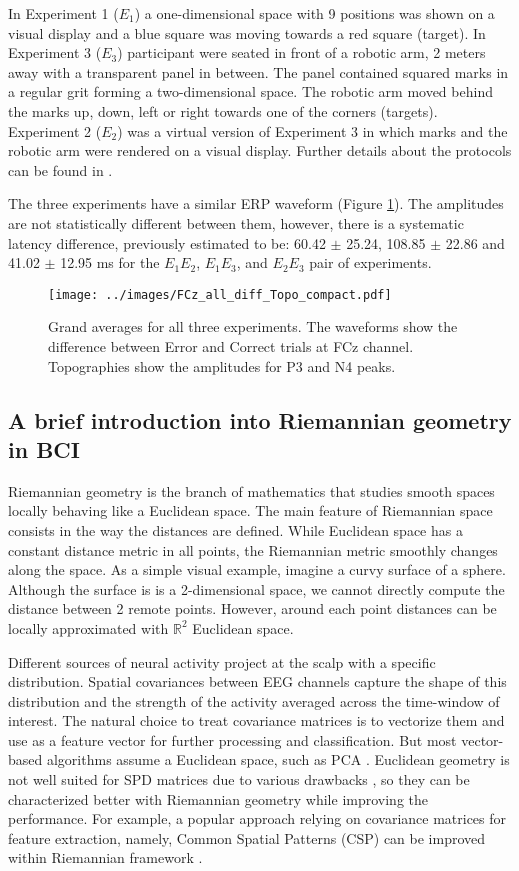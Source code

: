 \documentclass[12pt]{iopart}
\begin{document}
In Experiment 1 ($E_1$) a one-dimensional space with 9 positions was shown on a visual display and
a blue square was moving towards a red square (target). In Experiment 3 ($E_3$) participant were seated
in front of a robotic arm, 2 meters away with a transparent panel in between.
The panel contained squared marks in a regular grit forming a two-dimensional space.
The robotic arm moved behind the marks up, down, left or right 
towards one of the corners (targets).
Experiment 2 ($E_2$) was a virtual version of Experiment 3 in which marks and the robotic arm
were rendered on a visual display. Further details about the protocols can be found in \cite{iturrate_latency_2014-1}.

The three experiments have a similar ERP waveform (Figure \ref{fig:FCz}). The amplitudes are not statistically
different between them, however, there is a systematic latency
difference, previously estimated to be:
60.42 $\pm$ 25.24, 108.85 $\pm$ 22.86 and 41.02 $\pm$ 12.95 ms
for the $E_1 E_2$, $E_1 E_3$, and $E_2 E_3$ pair of experiments.

\begin{figure}[!t]
    \texttt{[image: ../images/FCz\_all\_diff\_Topo\_compact.pdf]}
\caption{Grand averages for all three experiments. The waveforms show the difference between
Error and Correct trials at FCz channel. Topographies show the amplitudes for P3 and N4 peaks.}
\label{fig:FCz}
\end{figure}


\subsection{A brief introduction into Riemannian geometry in BCI}
Riemannian geometry is the branch of mathematics that studies
smooth spaces locally behaving like a Euclidean space.
The main feature of Riemannian space consists in the way the distances are defined.
While Euclidean space has a constant distance metric in all points,
the Riemannian metric smoothly changes along the space.
As a simple visual example, imagine a curvy surface of a sphere.
Although the surface is is a 2-dimensional space,
we cannot directly compute the distance between 2 remote points.
However, around each point distances can be locally approximated
with $\mathbb{R}^2$ Euclidean space.

Different sources of neural activity project at the scalp with a specific distribution.
Spatial covariances between EEG channels capture the shape of this distribution
and the strength of the activity averaged across the time-window of interest.
The natural choice to treat covariance matrices is to vectorize them
and use as a feature vector for further processing and classification.
But most vector-based algorithms assume a Euclidean space, such as PCA \cite{hyvarinen_independent_2001}.
Euclidean geometry is not well suited for SPD matrices due to various
drawbacks \cite{arsigny_geometric_2007}, so they can be characterized 
better with Riemannian geometry while improving the performance.
For example, a popular approach relying on covariance matrices for feature extraction,
namely, Common Spatial Patterns (CSP) can be improved within Riemannian framework \cite{barachant_common_2010}.
\end{document}
